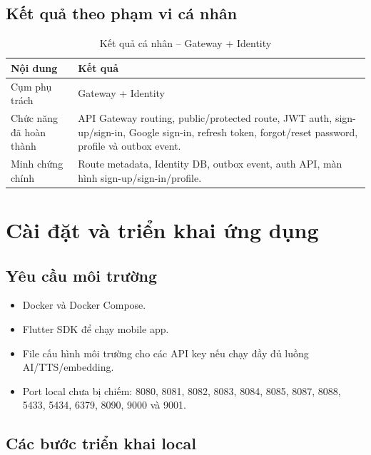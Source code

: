 \documentclass[14pt,a4paper,oneside]{extreport}
\begin{document}
\subsection{Kết quả theo phạm vi cá nhân}

\begin{table}[H]
\centering
\caption{Kết quả cá nhân -- Gateway + Identity}
\label{tab:ket-qua-ca-nhan}
\renewcommand{\arraystretch}{1.3}
\small
\begin{tabularx}{\textwidth}{|l|X|}
\hline
\textbf{Nội dung} & \textbf{Kết quả} \\
\hline
Cụm phụ trách & Gateway + Identity \\
\hline
Chức năng đã hoàn thành & API Gateway routing, public/protected route, JWT auth, sign-up/sign-in, Google sign-in, refresh token, forgot/reset password, profile và outbox event. \\
\hline
Minh chứng chính & Route metadata, Identity DB, outbox event, auth API, màn hình sign-up/sign-in/profile. \\
\hline
\end{tabularx}
\end{table}

\section{Cài đặt và triển khai ứng dụng}
\label{sec:cai-dat-trien-khai}

\subsection{Yêu cầu môi trường}

\begin{itemize}[leftmargin=2cm]
  \item Docker và Docker Compose.
  \item Flutter SDK để chạy mobile app.
  \item File cấu hình môi trường cho các API key nếu chạy đầy đủ luồng AI/TTS/embedding.
  \item Port local chưa bị chiếm: 8080, 8081, 8082, 8083, 8084, 8085, 8087, 8088, 5433, 5434, 6379, 8090, 9000 và 9001.
\end{itemize}

\subsection{Các bước triển khai local}
\end{document}
